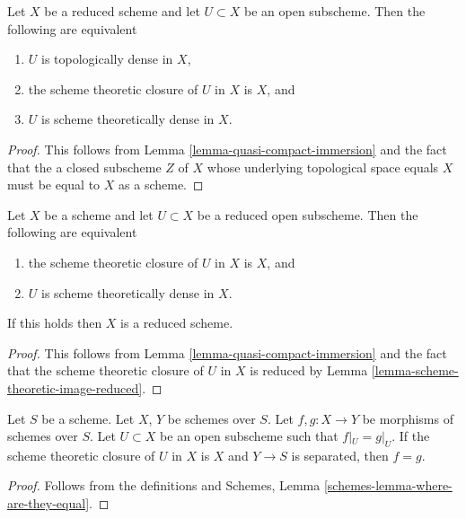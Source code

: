 \begin{lemma}
\label{lemma-reduced-scheme-theoretically-dense}
Let $X$ be a reduced scheme and let $U \subset X$ be an open subscheme.
Then the following are equivalent
\begin{enumerate}
\item $U$ is topologically dense in $X$,
\item the scheme theoretic closure of $U$ in $X$ is $X$, and
\item $U$ is scheme theoretically dense in $X$.
\end{enumerate}
\end{lemma}

\begin{proof}
This follows from
Lemma \ref{lemma-quasi-compact-immersion}
and the fact that the a closed subscheme $Z$ of $X$ whose
underlying topological space equals $X$ must be equal to $X$
as a scheme.
\end{proof}

\begin{lemma}
\label{lemma-reduced-subscheme-closure}
Let $X$ be a scheme and let $U \subset X$ be a reduced open subscheme.
Then the following are equivalent
\begin{enumerate}
\item the scheme theoretic closure of $U$ in $X$ is $X$, and
\item $U$ is scheme theoretically dense in $X$.
\end{enumerate}
If this holds then $X$ is a reduced scheme.
\end{lemma}

\begin{proof}
This follows from
Lemma \ref{lemma-quasi-compact-immersion}
and the fact that the scheme theoretic closure of $U$ in $X$ is
reduced by
Lemma \ref{lemma-scheme-theoretic-image-reduced}.
\end{proof}


\begin{lemma}
\label{lemma-equality-of-morphisms}
Let $S$ be a scheme. Let $X$, $Y$ be schemes over $S$.
Let $f, g : X \to Y$ be morphisms of schemes over $S$.
Let $U \subset X$ be an open subscheme such that
$f|_U = g|_U$. If the scheme theoretic closure of $U$
in $X$ is $X$ and $Y \to S$ is separated, then $f = g$.
\end{lemma}

\begin{proof}
Follows from the definitions and
Schemes, Lemma \ref{schemes-lemma-where-are-they-equal}.
\end{proof}




